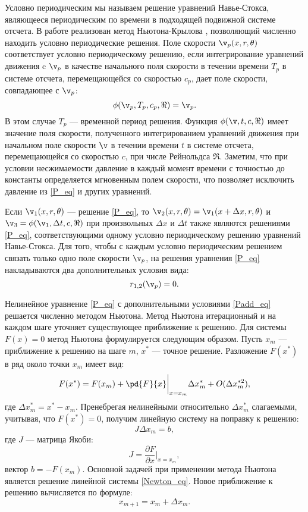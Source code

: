 Условно периодическим мы называем решение уравнений Навье-Стокса, являющееся периодическим по времени в подходящей подвижной системе отсчета. В работе реализован метод Ньютона-Крылова \cite{Sanchez2004}, позволяющий численно находить условно периодические решения. Поле скорости $\v_p(x,r,\theta)$ соответствует условно периодическому решению, если интегрирование уравнений движения c $\v_p$ в качестве начального поля скорости в течении времени $T_p$ в системе отсчета, перемещающейся со скоростью $c_p$, дает поле скорости, совпадающее с $\v_p$:
\begin{equation}\label{P_eq}
\phi(\v_p, T_p, c_p, \Re) = \v_p.
\end{equation}
В этом случае $T_p$  --- временной период решения. Функция $\phi(\v, t, c, \Re)$ имеет значение поля скорости, полученного интегрированием уравнений движения при начальном поле скорости $\v$ в течении времени $t$ в системе отсчета, перемещающейся со скоростью $c$, при числе Рейнольдса $\Re$. Заметим, что при условии несжимаемости давление в каждый момент времени с точностью до константы определяется мгновенным полем скорости, что позволяет исключить давление из \eqref{P_eq} и других уравнений. 

Если $\v_1(x,r,\theta)$ --- решение \eqref{P_eq}, то $\v_2(x, r, \theta) = \v_1(x + \Delta x, r, \theta)$ и $\v_3 = \phi(\v_1, \Delta t, c, \Re)$ при произвольных $\Delta x$ и $\Delta t$ также являются решениями \eqref{P_eq}, соответствующими одному условно периодическому решению уравнений Навье-Стокса. Для того, чтобы с каждым условно периодическим решением связать только одно поле скорости $\v_p$, на решения уравнения \eqref{P_eq} накладываются два дополнительных условия вида:
\begin{equation}\label{Padd_eq}
r_{1,2}(\v_p) = 0.
\end{equation}

Нелинейное уравнение \eqref{P_eq} с дополнительными условиями \eqref{Padd_eq} решается численно методом Ньютона. Метод Ньютона итерационный и на каждом шаге уточняет существующее приближение к решению. Для системы $F(x) = 0$ метод Ньютона формулируется следующим образом. Пусть $x_m$ --- приближение к решению на шаге $m$, $x^*$ --- точное решение. Разложение $F(x^*)$ в ряд около точки $x_m$ имеет вид:
\begin{equation}
F(x^*) = F(x_m) + \pd{F}{x}\bigg|_{x=x_m} \Delta x_m^* + O(\Delta x_m^{*2}), 
\end{equation}
где $\Delta x_m^* = x^* - x_m$. Пренебрегая нелинейными относительно $\Delta x_m^*$ слагаемыми, учитывая, что $F(x^*) = 0$, получим линейную систему на поправку к решению:
\begin{equation}\label{Newton_eq}
J \Delta x_m = b,
\end{equation}
где $J$ --- матрица Якоби:
$$
J = \frac{\partial F}{\partial x}\bigg|_{x = x_m},
$$
вектор $b = - F(x_m)$. 
Основной задачей при применении метода Ньютона является решение линейной системы \eqref{Newton_eq}. Новое приближение к решению вычисляется по формуле: 
\begin{equation} \label{end_NK_eq}
x_{m+1} = x_m + \Delta x_m. 
\end{equation}


